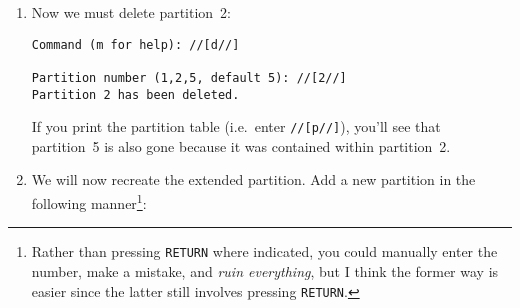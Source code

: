 \documentclass[12pt,letterpaper]{article}
\newcommand\kbd[1]{\textlangle\texttt{#1}\textrangle}
\newcommand\return{RETURN}
\begin{document}
\begin{enumerate}
\begin{lstlisting}[basicstyle=\ttfamily\footnotesize]
Device         Boot  Start      End   Blocks Id System
/dev/mmcblk0p1        2048   186367    92160  c W95 FAT32 (LBA)
/dev/mmcblkp2       186368  3667967  1740800  5 Extended
/dev/mmcblkp5       188416  3667967  1739776 83 Linux
\end{lstlisting}

The first partition is the boot partition.  The second is an extended partition used to overcome the 4~primary partition limit.  The third partition---that is, partition~5---is contained within partition~2, and holds only \SI{849.5}{\mebi\byte}\footnote{%
%
Note the distinction between \si{\mebi\byte} (1~mebibyte \(=1024\cdot1024\) bytes) and \si{\mega\byte} (1 megabyte \(=10^6\) bytes).  I've tried to be consistent in this document, but mistakes have a way of creeping in, and it's ultimately not terribly important.}, which is only a fraction of the disk's available space.

\item Now we must delete partition~2:
\begin{lstlisting}
Command (m for help): //[d//]

Partition number (1,2,5, default 5): //[2//]
Partition 2 has been deleted.
\end{lstlisting}

If you print the partition table (i.e.\ enter \lstinline{//[p//]}), you'll see that partition~5 is also gone because it was contained within partition~2.

\item We will now recreate the extended partition.  Add a new partition in the following manner\footnote{Rather than pressing \kbd{\return} where indicated, you could manually enter the number, make a mistake, and \emph{ruin everything}, but I think the former way is easier since the latter still involves pressing \kbd{\return}.}:


\end{enumerate}
\end{document}
